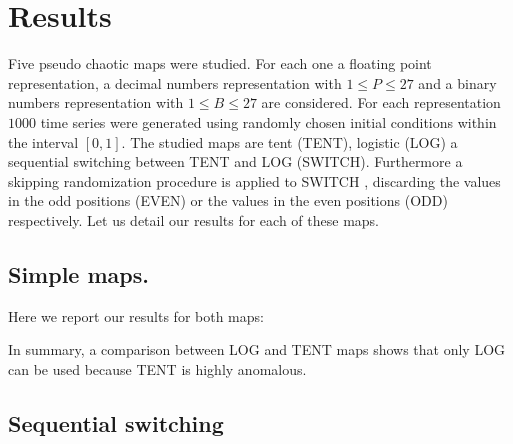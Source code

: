 \section{Results}\label{sec:resultados}
Five pseudo chaotic maps were studied. For each one a floating point representation, a decimal numbers representation with $1\leq P \leq 27$ and a binary numbers representation with $1\leq B \leq 27$ are considered. For each representation $1000$ time series were generated using randomly chosen initial conditions within the interval $[0,1]$. 
The studied maps are tent (TENT), logistic (LOG) a sequential switching between TENT and LOG (SWITCH). Furthermore a skipping randomization procedure is applied to SWITCH \cite{DeMicco2008}, discarding the values in the odd positions (EVEN) or the values in the even positions (ODD) respectively. Let us detail our results for each of these maps.   

\subsection {Simple maps.}\label{subsec:SimpleMaps}
Here we report our results for both maps:





In summary, a comparison between LOG and TENT maps shows that only LOG  can be used because TENT is highly anomalous. 

\subsection{Sequential switching}\label{subsec:SecSwitch}





